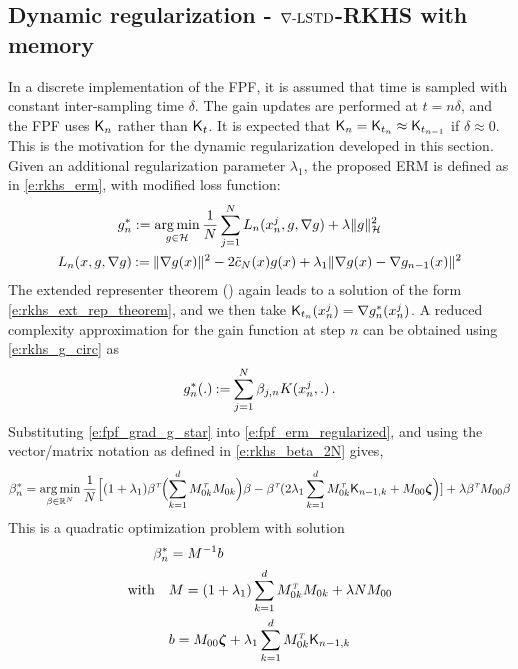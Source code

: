 \subsection{Dynamic regularization - $\nabla\text{-LSTD}$-RKHS with memory}
\label{s:fpf_rkhs_memory}
In a discrete implementation of the FPF, it is assumed that time is sampled with constant inter-sampling time $\delta$. The gain updates are performed at $t = n \delta$, and the FPF uses $\text{\sf K}_n$ rather than $\text{\sf K}_t$. It is expected that $\text{\sf K}_{n} = \text{\sf K}_{t_n}  \approx \text{\sf K}_{t_{n-1}}$ if $\delta\approx 0$.   This is the motivation for the dynamic regularization developed in this section.    Given an additional regularization parameter $\lambda_1$,  the proposed ERM is defined as in \eqref{e:rkhs_erm},  with modified loss function:
\begin{equation}
\begin{aligned}
g^*_n & := \argmin_{g \in \clH} \frac{1}{N} \sum_{j=1}^N  L_n(x_n^j,g,\nabla g) + \lambda \|g\|^2_\clH
\\
L_n(x,g,\nabla g) &  \eqdef  \| \nabla g(x) \|^2 - 2 \tilc_N(x)g(x)  + \lambda_1 \|\nabla g(x) -  \nabla g_{n-1}(x)\|^2
\end{aligned}
\label{e:fpf_erm_regularized}
\end{equation}
The extended representer theorem () again leads to a solution of the form \eqref{e:rkhs_ext_rep_theorem}, and we then take
$ \text{\sf K}_{t_n}(x^j_n) = \nabla g^*_n(x^j_n)$. A reduced complexity approximation for the gain function at step $n$ can be obtained using \eqref{e:rkhs_g_circ} as
\begin{equation}
g^*_n(.)  \eqdef \sum_{j=1}^N \beta_{j,n} \Kern(x^j_n, . ) \, .
\label{e:fpf_grad_g_star}
\end{equation}
Substituting \eqref{e:fpf_grad_g_star} into \eqref{e:fpf_erm_regularized}, and using the vector/matrix notation as defined in \eqref{e:rkhs_beta_2N} gives,
\begin{equation}
\beta ^*_n =
\mathop{\rm arg{\,}min}_{\beta  \in \mathbb{R}^N}  \frac{1}{N} \Bigl[ (1 + \lambda_1) \beta ^{\hbox{\tiny\it T}} \Bigl( \sum_{k=1}^d M_{0k}^{\hbox{\tiny\it T}} M_{0k} \Bigr) \beta  -  \beta ^{\hbox{\tiny\it T}}  ( 2 \lambda_1 \sum_{k=1}^d M_{0k}^{\hbox{\tiny\it T}} \text{\sf K}_{n-1,k} +M_{00} \boldsymbol{\zeta}  \Bigr) ] + \lambda \beta ^{\hbox{\tiny\it T}} M_{00} \beta
\end{equation}
This is a quadratic optimization problem with solution
\begin{equation}
\begin{aligned}
\beta ^*_n  &= M^{-1} b
\\
\text{with} \quad
&
M =  (1+ \lambda_1)\sum_{k=1}^d M_{0k}^\transpose M_{0k} + \lambda N M_{00}
\\
&b =  M_{00} \boldsymbol{\zeta}  + \lambda_1 \sum_{k =1}^d  M_{0k}^\transpose \kFPF_{n-1,k}
\end{aligned}
\label{e:fpf_beta_n}
\end{equation}


